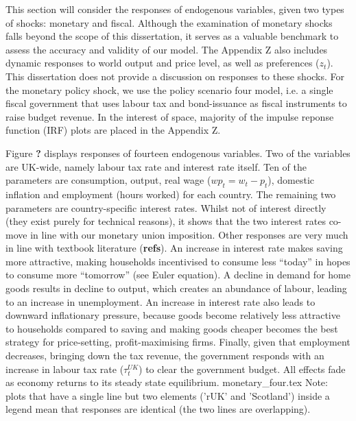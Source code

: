 This section will consider the responses of endogenous variables, given two types of shocks: monetary and fiscal. Although the examination of monetary shocks falls beyond the scope of this dissertation, it serves as a valuable benchmark to assess the accuracy and validity of our model. The Appendix Z also includes dynamic responses to world output and price level, as well as preferences ($z_t$). This dissertation does not provide a discussion on responses to these shocks. For the monetary policy shock, we use the policy scenario four model, i.e. a single fiscal government that uses labour tax and bond-issuance as fiscal instruments to raise budget revenue. In the interest of space, majority of the impulse reponse function (IRF) plots are placed in the Appendix Z. 

Figure \textbf{?} displays responses of fourteen endogenous variables. Two of the variables are UK-wide, namely labour tax rate and interest rate itself. Ten of the parameters are consumption, output, real wage ($wp_t = w_t - p_t$), domestic inflation and employment (hours worked) for each country. The remaining two parameters are country-specific interest rates. Whilst not of interest directly (they exist purely for technical reasons), it shows that the two interest rates co-move in line with our monetary union imposition. Other responses are very much in line with textbook literature (\textbf{refs}). An increase in interest rate makes saving more attractive, making households incentivised to consume less ``today'' in hopes to consume more ``tomorrow'' (see Euler equation). A decline in demand for home goods results in decline to output, which creates an abundance of labour, leading to an increase in unemployment. An increase in interest rate also leads to downward inflationary pressure, because goods become relatively less attractive to households compared to saving and making goods cheaper becomes the best strategy for price-setting, profit-maximising firms. Finally, given that employment decreases, bringing down the tax revenue, the government responds with an increase in labour tax rate ($\tau^{UK}_t$) to clear the government budget. All effects fade as economy returns to its steady state equilibrium.
{monetary_four.tex}
Note: plots that have a single line but two elements ('rUK' and 'Scotland') inside a legend mean that responses are identical (the two lines are overlapping).


